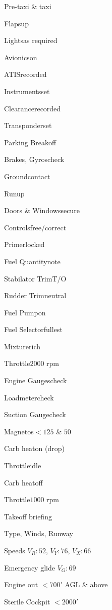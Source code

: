 \begin{multicols}{2}
\begin{checklist}{Pre-taxi \& taxi}
    \item{Flaps}{up}
    \item{Lights}{as required}
    \item{Avionics}{on}
    \item{ATIS}{recorded}
    \item{Instruments}{set}
    \item{Clearance}{recorded}
    \item{Transponder}{set}
    \item{Parking Break}{off}
    \item{Brakes, Gyros}{check}
    \item{Ground}{contact}
\end{checklist}

\begin{checklist}{Runup}
    \item{Doors \& Windows}{secure}
    \item{Controls}{free/correct}
    \item{Primer}{locked}
    \item{Fuel Quantity}{note}
    \item{Stabilator Trim}{T/O}
    \item{Rudder Trim}{neutral}
    \item{Fuel Pump}{on}
    \item{Fuel Selector}{fullest}
    \item{Mixture}{rich}
    \item{Throttle}{$2000$ rpm}
    \item{Engine Gauges}{check}
    \item{Loadmeter}{check}
    \item{Suction Gauge}{check}
    \item{Magnetos}{$<125$ \& $50$}
    \item{Carb heat}{on (drop)}
    \item{Throttle}{idle}
    \item{Carb heat}{off}
    \item{Throttle}{$1000$ rpm}
\end{checklist}

\begin{checklist}{Takeoff briefing}
    \item{Type, Winds, Runway}{}
    \item{Speeds $V_R: 52$, $V_Y: 76$, $V_X: 66$}{}
    \item{Emergency glide $V_G: 69$}{}
    \item{Engine out $<700'$ AGL \& above}{}
    \item{Sterile Cockpit $<2000'$}{}
\end{checklist}


\end{multicols}
